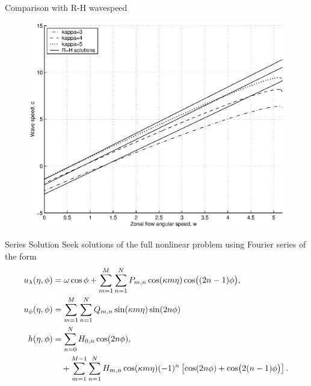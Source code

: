 \documentclass[pdf,distiller]{prosper}
\begin{document}
\begin{slide}{Comparison with R-H wavespeed}
\begin{figure}
	\centering
		\includegraphics[scale=0.49]{wvchconst1.eps}
\end{figure}
\end{slide}


\begin{slide}{Series Solution}
Seek solutions of the full nonlinear problem using Fourier series of the form
\begin{align*}
u_{\lambda}(\eta,\phi) &= \omega\cos\phi+\sum_{m=1}^M \sum_{n=1}^N P_{m,n}\cos(\kappa m \eta) \cos\bigl((2n-1)\phi\bigr),\\
u_{\phi}(\eta,\phi) &= \sum_{m=1}^M \sum_{n=1}^N Q_{m,n}\sin(\kappa m \eta) \sin(2n\phi)\\
h(\eta,\phi) &= \sum_{n=0}^N H_{0,n}\cos(2 n \phi) \notag, \\
&\quad+\sum_{m=1}^{M-1} \sum_{n=1}^N H_{m,n} \cos(\kappa m \eta) (-1)^n \left[ \cos(2n\phi)+\cos\bigl(2(n-1)\phi\bigr) \right].
\end{align*}
\end{slide}
\end{document}
